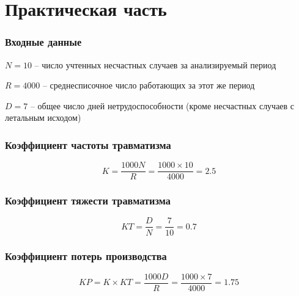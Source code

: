 \documentclass[a5paper, 12dd, twoside]{article}
\begin{document}
\section{Практическая часть}
\subsubsection*{Входные данные}
\(N = 10\) -- число учтенных несчастных случаев за анализируемый период

\(R = 4000\) -- среднесписочное число работающих за этот же период

\(D = 7\) -- общее число дней нетрудоспособности (кроме несчастных случаев с летальным исходом)

\subsubsection*{Коэффициент частоты травматизма}
\[K = \frac{1000N}{R} = \frac{1000 \times 10}{4000} = 2.5\]
\subsubsection*{Коэффициент тяжести травматизма}
\[KT = \frac{D}{N} = \frac{7}{10} = 0.7\]
\subsubsection*{Коэффициент потерь производства}
\[KP = K \times KT = \frac{1000 D}{R} = \frac{1000 \times 7}{4000} = 1.75\]
\end{document}
